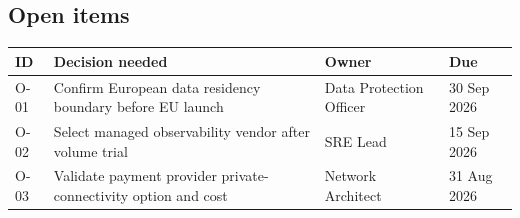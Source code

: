 \subsection{Open items}

\begin{tabularx}{\textwidth}{@{}C{13mm}Y L{34mm}C{26mm}@{}}
  \toprule
  \color{white}\textbf{ID} & \color{white}\textbf{Decision needed} & \color{white}\textbf{Owner} & \color{white}\textbf{Due} \\
  \midrule
  O-01 & Confirm European data residency boundary before EU launch & Data Protection Officer & 30 Sep 2026 \\
  O-02 & Select managed observability vendor after volume trial & SRE Lead & 15 Sep 2026 \\
  O-03 & Validate payment provider private-connectivity option and cost & Network Architect & 31 Aug 2026 \\
  \bottomrule
\end{tabularx}

